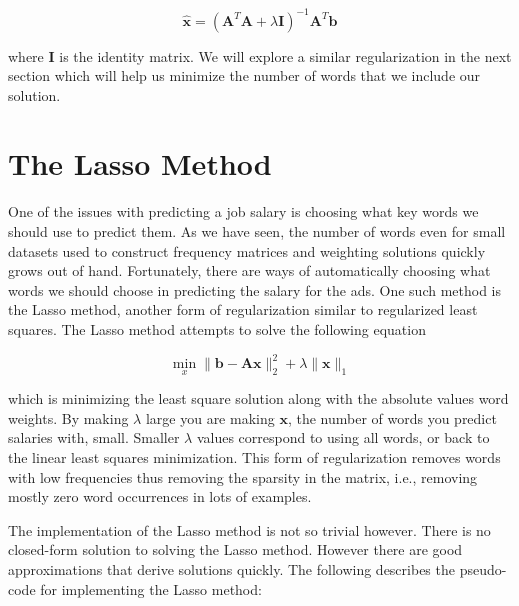\documentclass[12pt]{article}
\begin{document}
    \begin{equation}
        \bm{\hat{x}} = (\bm{A}^{T}\bm{A} + \lambda \bm{I})^{-1}\bm{A}^T\bm{b}
    \end{equation}

    \noindent where $\bm{I}$ is the identity matrix. We will explore a similar
    regularization in the next section which will help us minimize the number
    of words that we include our solution.

\section{The Lasso Method}

    One of the issues with predicting a job salary is choosing what key words
    we should use to predict them. As we have seen, the number of words even
    for small datasets used to construct frequency matrices and weighting
    solutions quickly grows out of hand. Fortunately, there are ways of
    automatically choosing what words we should choose in predicting the salary
    for the ads. One such method is the Lasso method, another form of
    regularization similar to regularized least squares. The Lasso method
    attempts to solve the following equation

    \begin{equation}
        \min_x \|\bm{b} - \bm{Ax}\|_2^2 + \lambda\|\bm{x}\|_1
    \end{equation}

    \noindent which is minimizing the least square solution along with the
    absolute values word weights. By making $\lambda$ large you are making
    $\bm{x}$, the number of words you predict salaries with, small. Smaller
    $\lambda$ values correspond to using all words, or back to the linear least
    squares minimization. This form of regularization removes words with low
    frequencies thus removing the sparsity in the matrix, i.e., removing mostly
    zero word occurrences in lots of examples. 

    The implementation of the Lasso method is not so trivial however. There is
    no closed-form solution to solving the Lasso method. However there are good
    approximations that derive solutions quickly. The following describes the
    pseudo-code for implementing the Lasso method:
\end{document}
